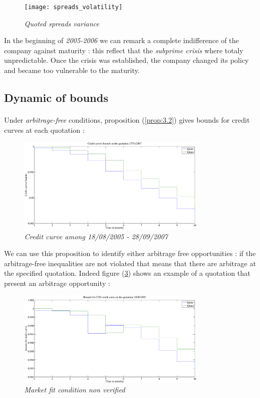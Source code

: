 \begin{figure}[H]
  \centering
\label{fig:6}
  \texttt{[image: spreads\_volatility]}
  \caption{\it Quoted spreads variance }
\end{figure}

In the beginning of \textit{2005-2006} we  can remark a complete indifference of
the  company against  maturity :  this reflect  that the \textit{ subprime crisis}  where
totaly unpredictable. Once  the crisis was established, the  company changed its
policy and became too vulnerable to the maturity.

\subsection{Dynamic of bounds }
\label{sec:dynamic-bounds-}

\paragraph{}
Under  \textit{arbitrage-free}  conditions, proposition  (\ref{prop:3.2})  gives
bounds for credit curves at each quotation :
\begin{figure}[H]

  \centering
  \includegraphics[width=0.8\textwidth]{cotation_27_11_2007}
  \caption{\it Credit curve among 18/08/2005 - 28/09/2007}
\label{fig7}
\end{figure}

We can  use this  proposition to
identify   either  arbitrage   free  opportunities   :  if   the  arbitrage-free
inequalities  are not  violated  that  means that  there  are  arbitrage at  the
specified quotation.  Indeed figure (\ref{fig:8}) shows an example of a quotation that
present an arbitrage opportunity :

\begin{figure}[H]
  \centering
  \includegraphics[width=0.8\textwidth]{cotation-18-08-2005}
  \caption{\it Market fit condition non verified}
  \label{fig:8}
\end{figure}

